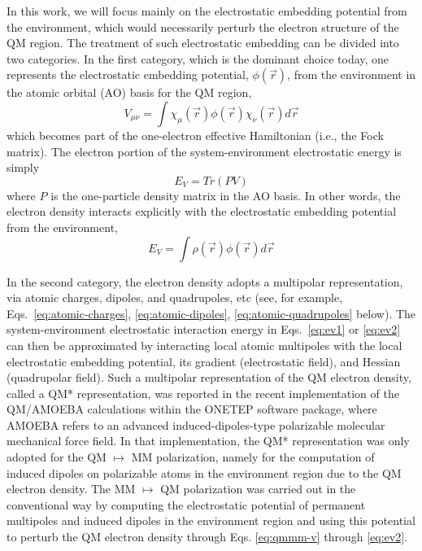 \documentclass[aip,jcp,preprint,superscriptaddress,amsmath,amssymb]{revtex4-1}
\begin{document}
In this work, we will focus mainly on the electrostatic embedding potential from the environment,
which would necessarily perturb the electron structure of the QM region.    
The treatment of such electrostatic embedding can be divided into two categories. 
In the first category, which is the dominant choice today, 
one represents the electrostatic embedding potential, $\phi(\vec{r})$, from the environment in the atomic orbital (AO) basis for the QM region, 
\begin{equation}
V_{\mu \nu} = \int \chi_{\mu} (\vec{r})  \phi(\vec{r}) \chi_{\nu} (\vec{r})  d \vec{r} 
\label{eq:qmmm-v}
\end{equation}
which becomes part of the one-electron effective Hamiltonian (i.e., the Fock matrix).   
The electron portion of the system-environment electrostatic energy is simply 
\begin{equation}
E_{V} = Tr( P V) 
\label{eq:ev1}
\end{equation}
where $P$ is the one-particle density matrix in the AO basis.     
In other words, the electron density interacts explicitly with the electrostatic embedding potential from the environment,
\begin{equation}
E_V = \int \rho(\vec{r})   \phi(\vec{r})  d \vec{r} 
\label{eq:ev2}
\end{equation}

In the second category, the electron density adopts a multipolar representation, 
via atomic charges, dipoles, and quadrupoles, etc (see, for example, Eqs.~\ref{eq:atomic-charges}, \ref{eq:atomic-dipoles}, \ref{eq:atomic-quadrupoles} below). 
The system-environment electrostatic interaction energy in Eqs.~\ref{eq:ev1} or \ref{eq:ev2} 
can then be approximated by interacting local atomic multipoles with the local electrostatic embedding potential, 
its gradient (electrostatic field), and Hessian (quadrupolar field).   
Such a multipolar representation of the QM electron density, called a QM* representation, 
was reported in the recent implementation of the QM/AMOEBA calculations within the ONETEP software package, 
where AMOEBA refers to an advanced induced-dipoles-type polarizable molecular mechanical force field. 
In that implementation, the QM* representation was only adopted for the QM $\mapsto$ MM polarization, 
namely for the computation of induced dipoles on polarizable atoms in the environment region due to the QM electron density.  
The MM $\mapsto$ QM polarization was carried out in the conventional way by computing the electrostatic potential of
permanent multipoles and induced dipoles in the environment region and using this potential to perturb the QM electron density 
through Eqs. \ref{eq:qmmm-v} through \ref{eq:ev2}.
\end{document}

